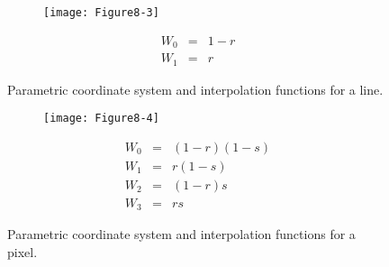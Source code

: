 \begin{description}

    \begin{figure}[!htb]
        \centering
        \begin{subfigure}{0.48\linewidth}
            \centering
            \texttt{[image: Figure8-3]}
            \caption*{}
        \end{subfigure}
        \hfill
        \begin{subfigure}{0.48\linewidth}
            \centering
            \begin{equation*}
            \begin{array}{lll}
                W_0 &=& 1-r \\
                W_1 &=& r
            \end{array}
            \end{equation*}
        \end{subfigure}%
        \caption{Parametric coordinate system and interpolation functions for a line.}
        \label{fig:Figure8-3}
    \end{figure}

    \begin{figure}[!htb]
        \centering
        \begin{subfigure}{0.48\linewidth}
            \centering
            \texttt{[image: Figure8-4]}
            \caption*{}
        \end{subfigure}
        \hfill
        \begin{subfigure}{0.48\linewidth}
            \centering
            \begin{equation*}
            \begin{array}{lll}
            W_0 &=& (1-r)(1 - s) \\
            W_1 &=& r(1 - s) \\
            W_2 &=& (1 - r)s \\
            W_3 &=& r s
            \end{array}
            \end{equation*}
        \end{subfigure}%
        \caption{Parametric coordinate system and interpolation functions for a pixel.}
        \label{fig:Figure8-4}
    \end{figure}


\end{description}
